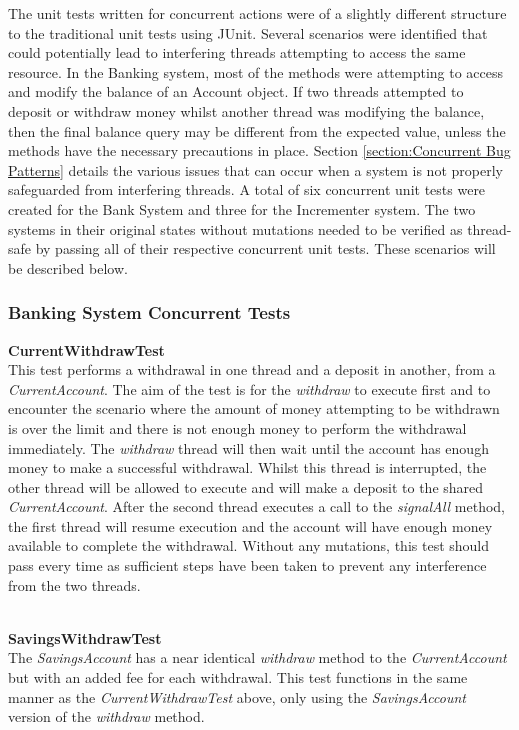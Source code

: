 \documentclass[a4paper,12pt]{article}
\begin{document}
The unit tests written for concurrent actions were of a slightly different structure to the traditional unit tests using JUnit. Several scenarios were identified that could potentially lead to interfering threads attempting to access the same resource. In the Banking system, most of the methods were attempting to access and modify the balance of an Account object. If two threads attempted to deposit or withdraw money whilst another thread was modifying the balance, then the final balance query may be different from the expected value, unless the methods have the necessary precautions in place. Section \ref{section:Concurrent Bug Patterns} details the various issues that can occur when a system is not properly safeguarded from interfering threads. A total of six concurrent unit tests were created for the Bank System and three for the Incrementer system. The two systems in their original states without mutations needed to be verified as thread-safe by passing all of their respective concurrent unit tests. These scenarios will be described below.   

\subsubsection{Banking System Concurrent Tests}

\textbf{CurrentWithdrawTest}
\\This test performs a withdrawal in one thread and a deposit in another, from a \textit{CurrentAccount}. The aim of the test is for the \textit{withdraw} to execute first and to encounter the scenario where the amount of money attempting to be withdrawn is over the limit and there is not enough money to perform the withdrawal immediately. The \textit{withdraw} thread will then wait until the account has enough money to make a successful withdrawal. Whilst this thread is interrupted, the other thread will be allowed to execute and will make a deposit to the shared \textit{CurrentAccount}. After the second thread executes a call to the \textit{signalAll} method, the first thread will resume execution and the account will have enough money available to complete the withdrawal. Without any mutations, this test should pass every time as sufficient steps have been taken to prevent any interference from the two threads.  

\textbf{\\SavingsWithdrawTest}
\\The \textit{SavingsAccount} has a near identical \textit{withdraw} method to the \textit{CurrentAccount} but with an added fee for each withdrawal. This test functions in the same manner as the \textit{CurrentWithdrawTest} above, only using the \textit{SavingsAccount} version of the \textit{withdraw} method.
\end{document}
